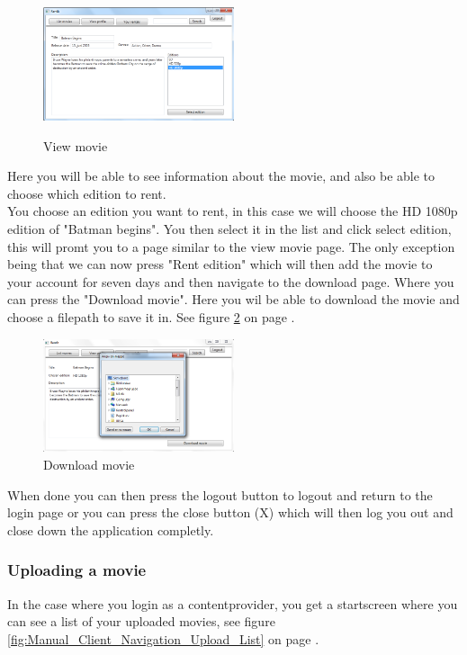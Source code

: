 \begin{figure}[h!]  
  \centering
\includegraphics[width=0.5\textwidth]{Parts/Images/Manual/Viewmovie}
\label{fig:Manual_Client_Navigation_Rent_View}
\caption{View movie}
\end{figure}
 
Here you will be able to see information about the movie, and also be able to choose which edition to rent.
\\ You choose an edition you want to rent, in this case we will choose the HD 1080p edition of "Batman begins". You then select it in the list and click select edition, this will promt you to a page similar to the view movie page. The only exception being that we can now press "Rent edition" which will then add the movie to your account for seven days and then navigate to the download page. Where you can press the "Download movie". Here you wil be able to download the movie and choose a filepath to save it in. See figure \ref{fig:Manual_Client_Navigation_Rent_Download} on page \pageref{fig:Manual_Client_Navigation_Rent_Download}.


\begin{figure}[h!]  
  \centering
\includegraphics[width=0.5\textwidth]{Parts/Images/Manual/Downloadmovie}
\caption{Download movie}
\label{fig:Manual_Client_Navigation_Rent_Download}
\end{figure}
 
When done you can then press the logout button to logout and return to the login page or you can press the close button (X) which will then log you out and close down the application completly.

\subsubsection{Uploading a movie}
\label{Manual_Client_Navigation_Upload}
In the case where you login as a contentprovider, you get a startscreen where you can see a list of your uploaded movies, see figure
\ref{fig:Manual_Client_Navigation_Upload_List} on page \pageref{fig:Manual_Client_Navigation_Upload_List}.


